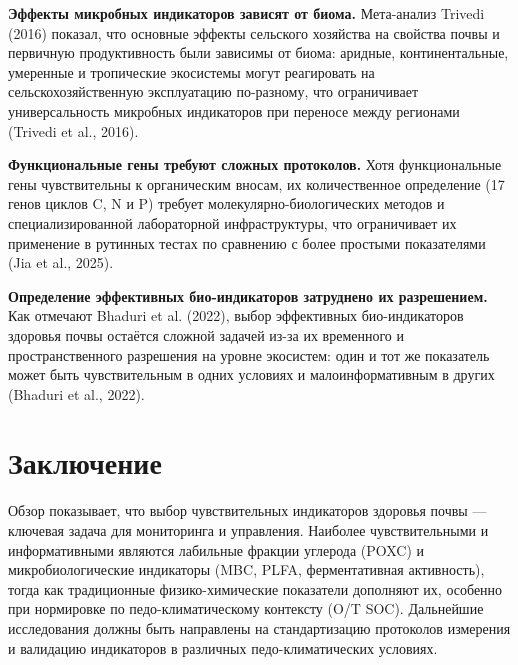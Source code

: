 \documentclass[11pt,a4paper]{article}
\begin{document}
\textbf{Эффекты микробных индикаторов зависят от биома.} Мета-анализ Trivedi
(2016) показал, что основные эффекты сельского хозяйства на свойства почвы и
первичную продуктивность были зависимы от биома: аридные, континентальные,
умеренные и тропические экосистемы могут реагировать на сельскохозяйственную
эксплуатацию по-разному, что ограничивает универсальность микробных
индикаторов при переносе между регионами (Trivedi et al., 2016).

\textbf{Функциональные гены требуют сложных протоколов.} Хотя функциональные
гены чувствительны к органическим вносам, их количественное определение
(17 генов циклов C, N и P) требует молекулярно-биологических методов и
специализированной лабораторной инфраструктуры, что ограничивает их применение
в рутинных тестах по сравнению с более простыми показателями (Jia et al., 2025).

\textbf{Определение эффективных био-индикаторов затруднено их разрешением.}
Как отмечают Bhaduri et al. (2022), выбор эффективных био-индикаторов здоровья
почвы остаётся сложной задачей из-за их временного и пространственного
разрешения на уровне экосистем: один и тот же показатель может быть
чувствительным в одних условиях и малоинформативным в других (Bhaduri et al., 2022).

\section{Заключение}
\label{sec:conclusion}

Обзор показывает, что выбор чувствительных индикаторов здоровья почвы ---
ключевая задача для мониторинга и управления. Наиболее чувствительными и
информативными являются лабильные фракции углерода (POXC) и микробиологические
индикаторы (MBC, PLFA, ферментативная активность), тогда как традиционные
физико-химические показатели дополняют их, особенно при нормировке по
педо-климатическому контексту (O/T SOC). Дальнейшие исследования должны быть
направлены на стандартизацию протоколов измерения и валидацию индикаторов в
различных педо-климатических условиях.
\end{document}
